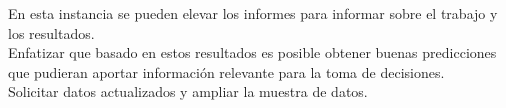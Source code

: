 En esta instancia se pueden elevar los informes para informar sobre el trabajo y los resultados.\\
Enfatizar que basado en estos resultados es posible obtener buenas predicciones que pudieran aportar información relevante para la toma de decisiones.\\
Solicitar datos actualizados y ampliar la muestra de datos.
